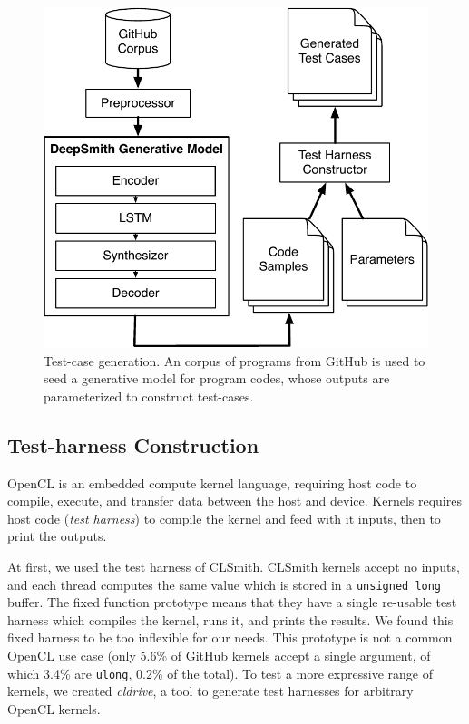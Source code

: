 \begin{figure}
  \centering
  \includegraphics[width=.80\columnwidth]{img/deepsmith} %
  \caption{%
    Test-case generation. An corpus of programs from GitHub is used to seed a generative model for program codes, whose outputs are parameterized to construct test-cases.%
  }%
  \label{fig:deeptune}
\end{figure}


\subsection{Test-harness Construction}

OpenCL is an embedded compute kernel language, requiring host code to compile, execute, and transfer data between the host and device. Kernels requires host code (\emph{test harness}) to compile the kernel and feed with it inputs, then to print the outputs.

At first, we used the test harness of CLSmith. CLSmith kernels accept no inputs, and each thread computes the same value which is stored in a \texttt{unsigned long} buffer. The fixed function prototype means that they have a single re-usable test harness which compiles the kernel, runs it, and prints the results. We found this fixed harness to be too inflexible for our needs. This prototype is not a common OpenCL use case (only 5.6\% of GitHub kernels accept a single argument, of which 3.4\% are \texttt{ulong}, 0.2\% of the total).
To test a more expressive range of kernels, we created \emph{cldrive}, a tool to generate test harnesses for arbitrary OpenCL kernels.

